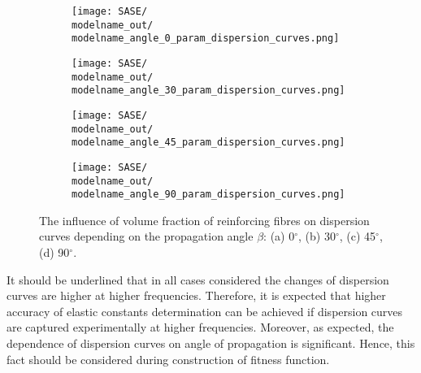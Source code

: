 \documentclass[preprint,12pt]{elsarticle}
\begin{document}
\begin{figure} [h!]
	\centering
	\newcommand{\modelname}{SASE8}
	\begin{subfigure}[b]{0.49\textwidth}
		\centering
		\texttt{[image: SASE/\\modelname\_out/\\modelname\_angle\_0\_param\_dispersion\_curves.png]}
		\caption{}
		\label{fig:vol0}
	\end{subfigure}
	\hfill
	\begin{subfigure}[b]{0.49\textwidth}
		\centering
		\texttt{[image: SASE/\\modelname\_out/\\modelname\_angle\_30\_param\_dispersion\_curves.png]}
		\caption{}
		\label{fig:vol30}
	\end{subfigure}
	\begin{subfigure}[b]{0.49\textwidth}
		\centering
		\texttt{[image: SASE/\\modelname\_out/\\modelname\_angle\_45\_param\_dispersion\_curves.png]}
		\caption{}
		\label{fig:vol45}
	\end{subfigure}
	\hfill
	\begin{subfigure}[b]{0.49\textwidth}
		\centering
		\texttt{[image: SASE/\\modelname\_out/\\modelname\_angle\_90\_param\_dispersion\_curves.png]}
		\caption{}
		\label{fig:vol90}
	\end{subfigure}
	\caption{The influence of volume fraction of reinforcing fibres on dispersion curves depending on the propagation angle $\beta$: (a) 0$^{\circ}$, (b) 30$^{\circ}$, (c) 45$^{\circ}$, (d) 90$^{\circ}$.} 
	\label{fig:vol}
\end{figure}

\clearpage
It should be underlined that in all cases considered the changes of dispersion curves are higher at higher frequencies. Therefore, it is expected that higher accuracy of elastic constants determination can be achieved if dispersion curves are captured experimentally at higher frequencies. Moreover, as expected, the dependence of dispersion curves on angle of propagation is significant. Hence, this fact should be considered during construction of fitness function.
\end{document}

